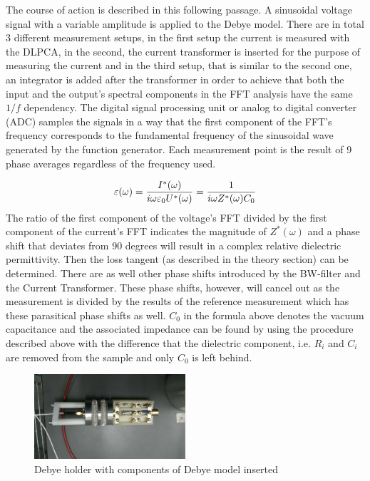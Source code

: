 The course of action is described in this following passage.
\newline
A sinusoidal voltage signal with a variable amplitude is applied to the Debye model. There are in total 3 different measurement setups,
in the first setup the current is measured with the DLPCA, in the second, the current transformer is inserted for the purpose of measuring 
the current and in the third setup, that is similar to the second one, an integrator is added after the transformer in order
to achieve that both the input and the output's spectral components in the FFT analysis have the same $1/f$ dependency.
The digital signal processing unit or analog to digital converter (ADC) samples the signals in a way that 
the first component of the FFT's frequency corresponds to the fundamental frequency
of the sinusoidal wave generated by the function generator. Each measurement point is the result of 9 phase averages regardless of the frequency used.



\begin{equation}
\varepsilon(\omega)=\frac{I^*(\omega)}{i \omega \varepsilon_0 U^*(\omega)} = \frac{1}{i \omega Z^*(\omega) C_0}\\
\end{equation}
The ratio of the first component of the voltage's FFT divided by the first component of the current's FFT indicates the magnitude
of $Z^*(\omega)$ and a phase shift that deviates from 90 degrees will result in a complex relative dielectric permittivity. Then the loss tangent (as described in the theory section) can be determined. There are as well other phase shifts introduced by the BW-filter and the Current Transformer. These phase shifts, however, will cancel out as the measurement is divided by the results of the reference measurement which has these parasitical phase shifts as well. 
\newline
$C_0$ in the formula above denotes the vacuum capacitance and the associated impedance can be found by using the procedure described above with the difference that
the dielectric component, i.e. $R_i$ and $C_i$ are removed from the sample and only $C_0$ is left behind.

\begin{figure}[h!tb]
 \centering

 \includegraphics[width=0.5\textwidth]{figures/Method/Experimentaufbau/debyesample}
 \caption[Kurze Abbildungsbeschreibung]{Debye holder with components of Debye model inserted}

 
 
 \end{figure}

